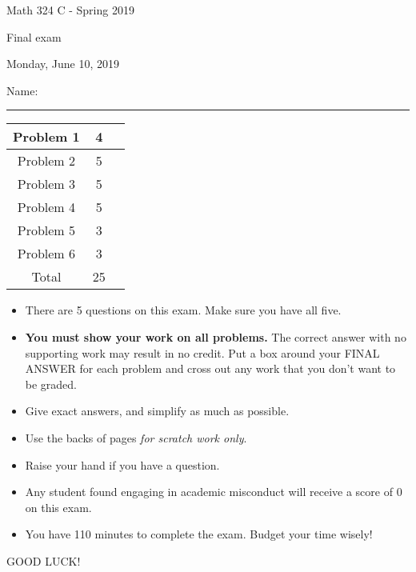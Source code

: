 \documentclass[12 pt]{report}
\begin{document}
\noindent \vfill \noindent \large

\centerline{Math 324 C  - Spring 2019}

\centerline{Final exam}

\centerline{Monday, June 10, 2019}

\normalsize

\vfill
\medskip
Name: \rule{10cm}{1pt}

\bigskip

\vfill
\begin{center}
{\large
\begin{tabular}{||c|c|r||}
\hline Problem 1 & 4 & \hspace{10mm} \hfill \\
\hline Problem 2 & 5  & \hspace{10mm} \hfill \\
\hline Problem 3 & 5 & \hspace{10mm} \hfill \\
\hline Problem 4 & 5  & \hspace{10mm} \hfill \\
\hline Problem 5 & 3  & \hspace{10mm} \hfill \\
\hline Problem 6 & 3 & \hspace{10mm} \hfill \\
\hline Total & 25 & \hspace{10mm} \hfill \\
\hline
\end{tabular}
}
\end{center}
\vfill
\begin{itemize}
\item There are 5 questions on this exam. Make sure you have all five.
\item \textbf{You must show your work on all problems.}  The correct answer
with no supporting work may result in no credit. Put a box
around your FINAL ANSWER for each problem and cross out any work
that you don't want to be graded.
\item Give exact answers, and simplify as much as possible. 
\item Use the backs of pages \textit{for scratch work only}.
\item Raise your hand if you have a question.
\item Any student found engaging in academic misconduct will receive
a score of 0 on this exam.
\item You have 110 minutes to complete the exam.  Budget your time wisely! \\
\end{itemize}
\vfill
\begin{center}GOOD LUCK!\end{center}
\end{document}
